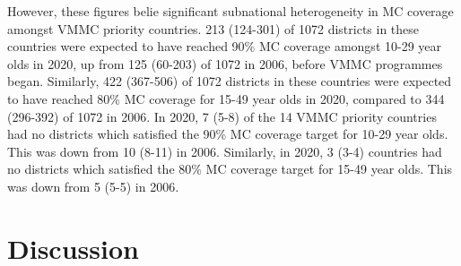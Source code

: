 \documentclass{article}
\begin{document}
However, these figures belie significant subnational heterogeneity in MC coverage amongst VMMC priority countries. 213 (124-301) of 1072 districts in these countries were expected to have reached 90\% MC coverage amongst 10-29 year olds in 2020, up from 125 (60-203) of 1072 in 2006, before VMMC programmes began. Similarly, 422 (367-506) of 1072 districts in these countries were expected to have reached 80\% MC coverage for 15-49 year olds in 2020, compared to 344 (296-392) of 1072 in 2006. In 2020, 7 (5-8) of the 14 VMMC priority countries had no districts which satisfied the 90\% MC coverage target for 10-29 year olds. This was down from 10 (8-11) in 2006. Similarly, in 2020, 3 (3-4) countries had no districts which satisfied the 80\% MC coverage target for 15-49 year olds. This was down from 5 (5-5) in 2006.


\section*{Discussion}




\end{document}
